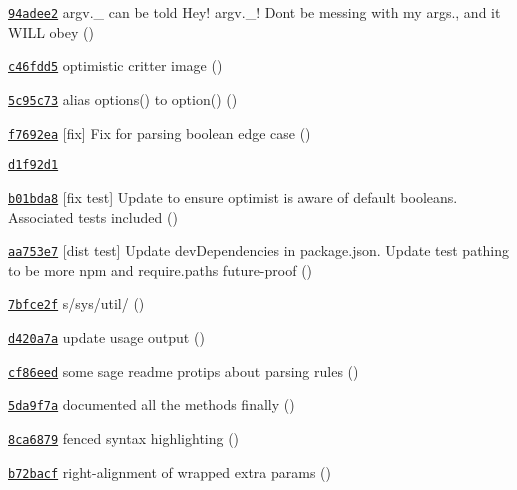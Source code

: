 \begin{DoxyItemize}
\item \href{https://github.com/bcoe/yargs/commit/94adee20e17b58d0836f80e8b9cdbe9813800916}{\tt 94adee2} argv.\+\_\+ can be told \textquotesingle{}Hey! argv.\+\_\+! Don\textquotesingle{}t be messing with my args.\textquotesingle{}, and it W\+I\+LL obey ()
\item \href{https://github.com/bcoe/yargs/commit/c46fdd56a05410ae4a1e724a4820c82e77ff5469}{\tt c46fdd5} optimistic critter image ()
\item \href{https://github.com/bcoe/yargs/commit/5c95c73aedf4c7482bd423e10c545e86d7c8a125}{\tt 5c95c73} alias options() to option() ()
\item \href{https://github.com/bcoe/yargs/commit/f7692ea8da342850af819367833abb685fde41d8}{\tt f7692ea} \mbox{[}fix\mbox{]} Fix for parsing boolean edge case ()
\item \href{https://github.com/bcoe/yargs/commit/d1f92d1425bd7f356055e78621b30cdf9741a3c2}{\tt d1f92d1}
\item \href{https://github.com/bcoe/yargs/commit/b01bda8d86e455bbf74ce497864cb8ab5b9fb847}{\tt b01bda8} \mbox{[}fix test\mbox{]} Update to ensure optimist is aware of default booleans. Associated tests included ()
\item \href{https://github.com/bcoe/yargs/commit/aa753e7c54fb3a12f513769a0ff6d54aa0f63943}{\tt aa753e7} \mbox{[}dist test\mbox{]} Update dev\+Dependencies in package.\+json. Update test pathing to be more npm and require.\+paths future-\/proof ()
\item \href{https://github.com/bcoe/yargs/commit/7bfce2f3b3c98e6539e7549d35fbabced7e9341e}{\tt 7bfce2f} s/sys/util/ ()
\item \href{https://github.com/bcoe/yargs/commit/d420a7a9c890d2cdb11acfaf3ea3f43bc3e39f41}{\tt d420a7a} update usage output ()
\item \href{https://github.com/bcoe/yargs/commit/cf86eede2e5fc7495b6ec15e6d137d9ac814f075}{\tt cf86eed} some sage readme protips about parsing rules ()
\item \href{https://github.com/bcoe/yargs/commit/5da9f7a5c0e1758ec7c5801fb3e94d3f6e970513}{\tt 5da9f7a} documented all the methods finally ()
\item \href{https://github.com/bcoe/yargs/commit/8ca6879311224b25933642987300f6a29de5c21b}{\tt 8ca6879} fenced syntax highlighting ()
\item \href{https://github.com/bcoe/yargs/commit/b72bacf1d02594778c1935405bc8137eb61761dc}{\tt b72bacf} right-\/alignment of wrapped extra params ()

\end{DoxyItemize}

